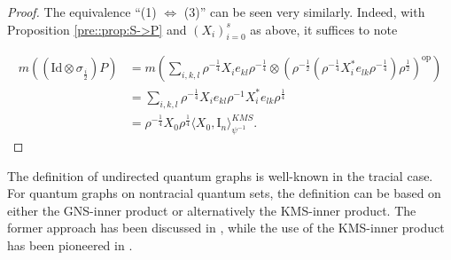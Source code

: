 \documentclass{amsart}
\newcommand{\comments}[1]{}
\DeclareMathOperator{\op}{op}
\begin{document}
\begin{proof}
    The equivalence ``(1) $\Leftrightarrow$ (3)'' can be seen very similarly. Indeed, with Proposition \ref{pre::prop:S->P} and $(X_i)_{i=0}^s$ as above, it suffices to note
    \comments{
    \begin{align*}
        m((\mathrm{Id} \otimes \sigma_{\frac{i}{2}})P)
        &= m\left(\sum_{i,k,l}\rho^{-\frac{1}{4}}X_ie_{kl}\rho^{-\frac{1}{4}}\otimes
        \left(\rho^{-\frac{1}{2}} \left( \rho^{-\frac{1}{4}}X_i^*e_{lk}\rho^{-\frac{1}{4}} \right) \rho^{\frac{1}{2}}\right)^{\op}\right) \\
        &= \sum_{i,k,l} \rho^{-\frac{1}{4}}X_ie_{kl}\rho^{-1}X_i^*e_{lk}\rho^{\frac{1}{4}} 
    \end{align*}
    By using that $\sum_le_{kl}\rho^{-1}X_i^*e_{lk}=\mathrm{Tr}\left(X_i^* \rho^{ -\frac{1}{2}} \mathrm{I}_n \rho^{-\frac{1}{2}}\right) e_{kk}$ we get
    \begin{align*}
        m(P_\psi)
        =\rho^{-\frac{1}{4}}X_0\rho^{\frac{1}{4}} \langle X_0, \mathrm{I}_n \rangle_{\psi^{-1}}^{KMS}.
    \end{align*}
    }
    \begin{align*}
        m((\mathrm{Id} \otimes \sigma_{\frac{i}{2}})P)
        &= m\left(\sum_{i,k,l}\rho^{-\frac{1}{4}}X_ie_{kl}\rho^{-\frac{1}{4}}\otimes
        \left(\rho^{-\frac{1}{2}} \left( \rho^{-\frac{1}{4}}X_i^*e_{lk}\rho^{-\frac{1}{4}} \right) \rho^{\frac{1}{2}}\right)^{\op}\right) \\
        &= \sum_{i,k,l} \rho^{-\frac{1}{4}}X_ie_{kl}\rho^{-1}X_i^*e_{lk}\rho^{\frac{1}{4}} \\
        &= \rho^{-\frac{1}{4}}X_0\rho^{\frac{1}{4}} \langle X_0, \mathrm{I}_n \rangle_{\psi^{-1}}^{KMS}.
    \end{align*}
\end{proof}

The definition of undirected quantum graphs is well-known in the tracial case. For quantum graphs on nontracial quantum sets, the definition can be based on either the GNS-inner product or alternatively the KMS-inner product. The former approach has been discussed in \cite{daws_quantum_2024}, while the use of the KMS-inner product has been pioneered in \cite{wasilewski_quantum_2024}. 
\end{document}

